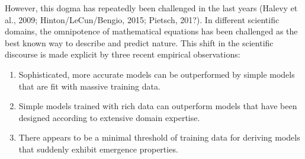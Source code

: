 \documentclass[authoryear,review,3p]{elsarticle}
\begin{document}
However, this dogma has repeatedly been challenged in the last years
(Halevy et al., 2009; Hinton/LeCun/Bengio, 2015; Pietsch, 201?).
In different scientific domains,
the omnipotence of mathematical equations has been challenged
as the
best known way to describe and predict nature.
%
This shift in the scientific discourse is made explicit by
three recent empirical observations:
\begin{enumerate}
  \item Sophisticated, more accurate models can be outperformed by
  simple models that are fit with massive training data.
  \item Simple models trained with rich data can outperform
  models that have been designed according to
  extensive domain expertise.
  \item There appears to be a minimal threshold of training data
  for deriving models that suddenly exhibit emergence properties.
\end{enumerate}
\end{document}
